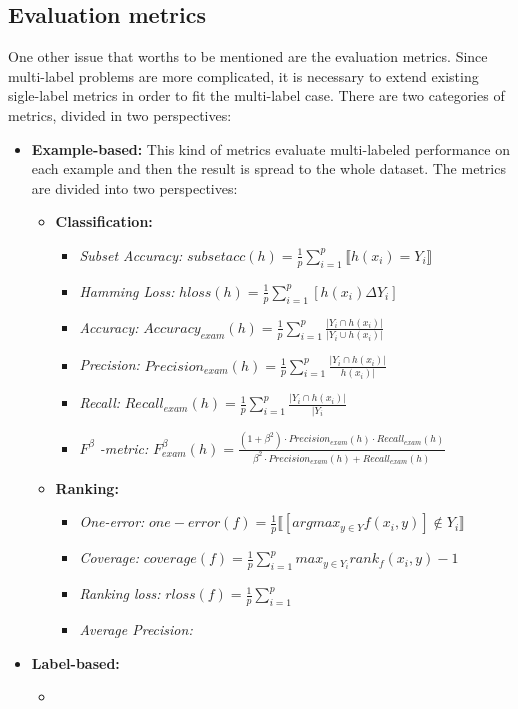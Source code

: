 \documentclass[12pt]{report}
\begin{document}
	\subsection*{Evaluation metrics}
	One other issue that worths to be mentioned are the evaluation metrics. Since multi-label problems are more complicated, it is necessary to extend existing sigle-label metrics in order to fit the multi-label case. There are two categories of metrics, divided in two perspectives:
	\begin{itemize}
		\item \textbf{Example-based: }This kind of metrics evaluate multi-labeled performance on each example and then the result is spread to the whole dataset. The metrics are divided into two perspectives:
		\begin{itemize}
			\item \textbf{Classification:} 
			\begin{itemize}
				\item \emph{Subset Accuracy: } $subsetacc(h) = \frac{1}{p} \sum_{i=1}^p \llbracket h(x_i) = Y_i \rrbracket$
				\item \emph{Hamming Loss: }$hloss(h) = \frac{1}{p} \sum_{i=1}^{p} [h(x_i)\Delta Y_i] $
				\item \emph{Accuracy:} $Accuracy_{exam}(h) = \frac{1}{p} \sum_{i=1}^{p} \frac{|Y_i \cap h(x_i)|}{|Y_i \cup h(x_i)|}$
				\item \emph{Precision: }$Precision_{exam}(h) = \frac{1}{p} \sum_{i=1}^{p} \frac{|Y_i \cap h(x_i)|}{h(x_i)|}$
				\item \emph{Recall: }$Recall_{exam}(h) = \frac{1}{p} \sum_{i=1}^{p} \frac{|Y_i \cap h(x_i)|}{|Y_i}$
				\item \emph{$F^ \beta$ -metric: } $F^ \beta _{exam} (h) = \frac{(1+ \beta ^2) \cdot Precision_{exam}(h) \cdot Recall_{exam}(h)}{\beta ^2 \cdot Precision_{exam}(h) + Recall_{exam}(h)}$
			\end{itemize}
			\item \textbf{Ranking:}
			\begin{itemize}
				\item \emph{One-error: }$one-error(f) = \frac{1}{p} \llbracket [argmax_{y \in Y}f(x_i,y)] \notin Y_i \rrbracket$
				\item \emph{Coverage: } $coverage(f) = \frac{1}{p} \sum_{i=1}^{p} max_{y \in Y_i} rank_f(x_i,y) - 1$
				\item \emph{Ranking loss: }$rloss(f) = \frac{1}{p} \sum_{i=1}^{p} $ 
				\item \emph{Average Precision: } 
			\end{itemize}
		\end{itemize}
		\item \textbf{Label-based: }
		\begin{itemize}
			\item {}
		\end{itemize}
	\end{itemize}
	
\end{document}
